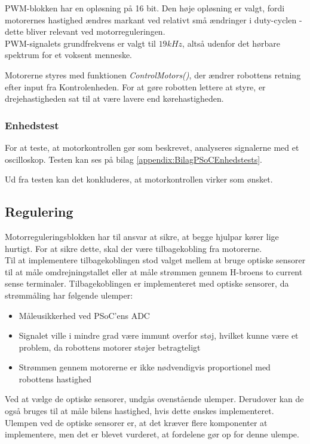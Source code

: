 PWM-blokken har en opløsning på 16 bit. 
Den høje opløsning er valgt, fordi motorernes hastighed ændres markant ved relativt små ændringer i duty-cyclen - dette bliver relevant ved motorreguleringen. \\
PWM-signalets grundfrekvens er valgt til $19 kHz$, altså udenfor det hørbare spektrum for et voksent menneske. 

Motorerne styres med funktionen \textit{ControlMotors()}, der ændrer robottens retning efter input fra Kontrolenheden. 
For at gøre robotten lettere at styre, er drejehastigheden sat til at være lavere end kørehastigheden. 

\subsubsection{Enhedstest}
For at teste, at motorkontrollen gør som beskrevet, analyseres signalerne med et oscilloskop. 
Testen kan ses på bilag \ref{appendix:BilagPSoCEnhedstests}.

Ud fra testen kan det konkluderes, at motorkontrollen virker som ønsket.

\subsection{Regulering}
Motorreguleringsblokken har til ansvar at sikre, at begge hjulpar kører lige hurtigt. 
For at sikre dette, skal der være tilbagekobling fra motorerne. \\
Til at implementere tilbagekoblingen stod valget mellem at bruge optiske sensorer til at måle omdrejningstallet eller at måle strømmen gennem H-broens to current sense terminaler.
Tilbagekoblingen er implementeret med optiske sensorer, da strømmåling har følgende ulemper:

\begin{itemize}
	\item Måleusikkerhed ved PSoC'ens ADC
	\item Signalet ville i mindre grad være immunt overfor støj, hvilket kunne være et problem, da robottens motorer støjer betragteligt
	\item Strømmen gennem motorerne er ikke nødvendigvis proportionel med robottens hastighed
\end{itemize}

Ved at vælge de optiske sensorer, undgås ovenstående ulemper. 
Derudover kan de også bruges til at måle bilens hastighed, hvis dette ønskes implementeret. 
Ulempen ved de optiske sensorer er, at det kræver flere komponenter at implementere, men det er blevet vurderet, at fordelene gør op for denne ulempe.

